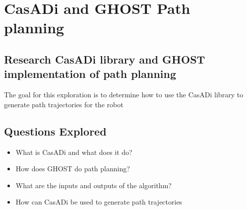 \section*{CasADi and GHOST Path planning}

\subsection*{Research CasADi library and GHOST implementation of path planning}
The goal for this exploration is to determine how to use the CasADi library to generate path trajectories for the robot

\subsection*{Questions Explored}
\begin{itemize}
    \item What is CasADi and what does it do?
    \item How does GHOST do path planning?
    \item What are the inputs and outputs of the algorithm?
    \item How can CasADi be used to generate path trajectories
\end{itemize}

